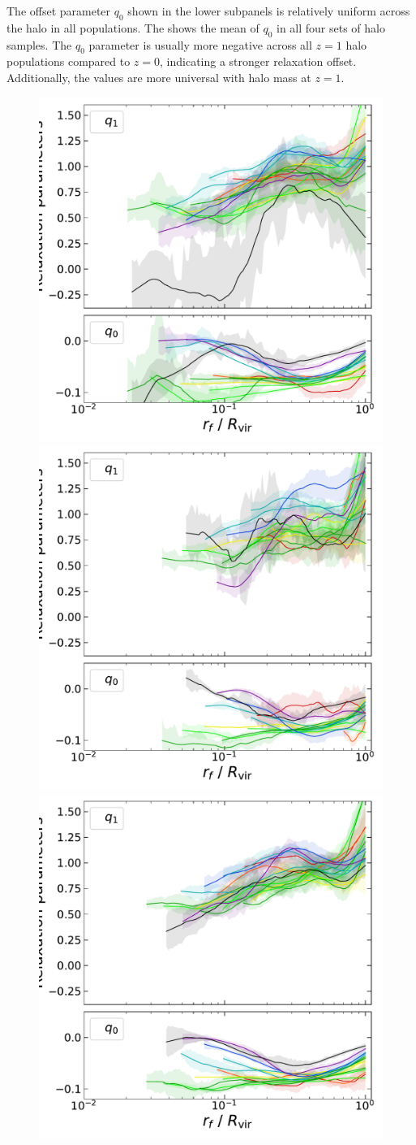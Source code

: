 The offset parameter $q_0$ shown in the lower subpanels is relatively uniform across the halo in all populations. The  shows the mean of $q_0$ in all four sets of halo samples. The $q_0$ parameter is usually more negative across all $z=1$ halo populations compared to $z=0$, indicating a stronger relaxation offset. Additionally, the values are more universal with halo mass at $z=1$. 


\begin{figure}[htbp]
\centering
\includegraphics[width=0.48\linewidth,trim={0.5cm 0 0 0},clip]{plots/fit_params_rf_M_T_snap049.pdf}
\includegraphics[width=0.48\linewidth,trim={0.5cm 0 0 0},clip]{plots/fit_params_rf_M_T_snap049_smpl98.pdf}
\includegraphics[width=0.48\linewidth,trim={0.5cm 0 0 0},clip]{plots/fit_params_rf_M_T_snap049_smpl98_allHalsMrange.pdf}

\end{figure}
